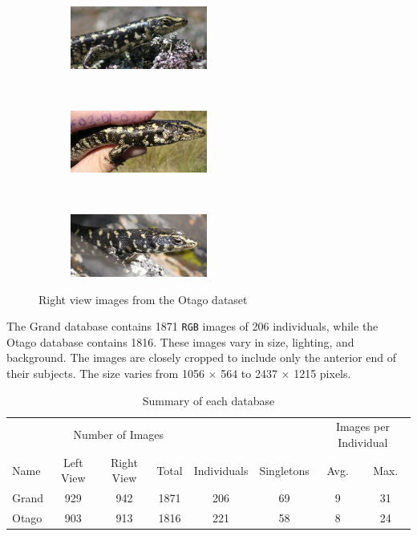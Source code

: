 \begin{figure}[htb]
  \centering
  \begin{subfigure}[t]{0.31\textwidth}
      \centering
      \includegraphics[width=4.5cm]{dataset/general/otago_R2}
  \end{subfigure}%
  ~
  \begin{subfigure}[t]{0.31\textwidth}
      \centering
      \includegraphics[width=4.5cm]{dataset/general/otago_R1}
  \end{subfigure}
  ~
  \begin{subfigure}[t]{0.31\textwidth}
      \centering
      \includegraphics[width=4.5cm]{dataset/general/otago_R3}
  \end{subfigure}
  \captionsetup{justification=centering}
  \caption{Right view images from the Otago dataset}
  \label{fig:otago_right} %
\end{figure}

The Grand database contains 1871 \texttt{RGB} images of 206 individuals, while
the Otago database contains 1816. These images vary in size, lighting, and
background. The images are closely cropped to include only the anterior end of
their subjects. The size varies from 1056 $\times$ 564 to 2437 $\times$ 1215
pixels.

\begin{table}[htb]
\captionsetup{justification=centering}
  \caption{Summary of each database}
  \label{tab:database_summary} %
  \centering
  \begin{tabular}{lccccccc}
    \toprule
    & \multicolumn{3}{c}{Number of Images} & & &
        \multicolumn{2}{c}{Images per Individual} \\
    \cmidrule{2-4}
    \cmidrule{7-8}
    Name & Left View & Right View & Total & Individuals & Singletons & Avg.
        & Max. \\
    \midrule
    Grand & 929 & 942 & 1871 & 206  & 69 & 9 & 31 \\
    Otago & 903 & 913 & 1816 & 221  & 58 & 8 & 24 \\
    \bottomrule
  \end{tabular}
\end{table}


